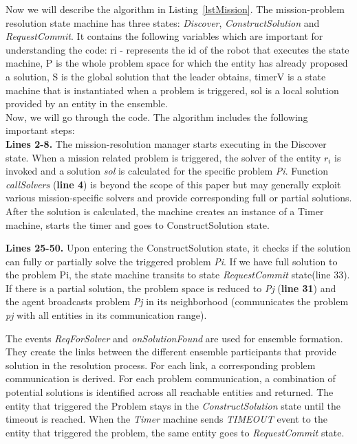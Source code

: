 \documentclass[journal]{IEEEtran}
\theoremstyle{definition}
\begin{document}
 
Now we will describe the algorithm in Listing~\ref{lstMission}. 
The mission-problem resolution state machine has three states: \textit{Discover}, \textit{ConstructSolution} and \textit{RequestCommit}. 
It contains the following variables which are important for understanding the code: 
ri - represents the id of the robot that executes the state machine, P is the whole problem space for which the entity has already proposed a solution, S is the global solution that the leader obtains, timerV is a state machine that is instantiated when a problem is triggered, sol is a local solution provided by an entity in the ensemble. \\
Now, we will go through the code.
The algorithm includes the following important steps: \\
\textbf{Lines 2-8.} The mission-resolution manager starts executing in the Discover state. When a mission related problem is triggered, the solver of the entity $r_i$ is invoked and a solution \textit{sol}
is calculated for the specific problem \textit{Pi}. Function \textit{callSolvers} (\textbf{line 4}) 
is beyond the scope of this paper but may generally exploit
various mission-specific solvers and provide corresponding full or partial solutions.  After the solution is calculated, the machine creates an instance of a Timer machine, starts the timer and goes to ConstructSolution state.

\textbf{Lines 25-50.} Upon entering the ConstructSolution state, 
it checks if the solution can fully or partially solve the triggered problem \textit{Pi}. If we have full solution to the problem Pi, the state machine transits to state \textit{RequestCommit} state(line 33).
If there is a partial solution, the problem space is reduced to \textit{Pj} (\textbf{line 31}) and  the agent broadcasts problem \textit{Pj} in its neighborhood (communicates the problem \textit{pj} with all entities in its communication range).

The events \textit{ReqForSolver} and \textit{onSolutionFound} are used for ensemble formation. 
They create the links between the different ensemble participants that provide solution in the resolution process. For each link, a corresponding problem communication is derived. For each problem communication, a combination of potential solutions is identified across all reachable entities and returned. The entity that triggered the Problem stays in the \textit{ConstructSolution} state until the timeout is reached. When the \textit{Timer} machine sends \textit{TIMEOUT} event to the entity that triggered the problem, the same entity goes to \textit{RequestCommit} state.
\end{document}
